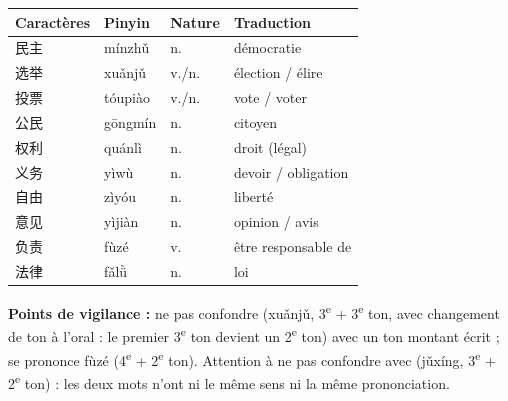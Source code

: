 \documentclass[11pt]{article}
\newcommand{\zh}[1]{\ifmmode\text{#1}\else{#1}\fi}
\begin{document}
\begin{corrige}
\begin{center}
\begin{tabularx}{\linewidth}{|X|X|X|X|}
\hline
\rowcolor{popblueL} \textbf{Caractères} & \textbf{Pinyin} & \textbf{Nature} & \textbf{Traduction} \\ \hline
民主 & mínzhǔ & n. & démocratie \\ \hline
选举 & xuǎnjǔ & v./n. & élection / élire \\ \hline
投票 & tóupiào & v./n. & vote / voter \\ \hline
公民 & gōngmín & n. & citoyen \\ \hline
权利 & quánlì & n. & droit (légal) \\ \hline
义务 & yìwù & n. & devoir / obligation \\ \hline
自由 & zìyóu & n. & liberté \\ \hline
意见 & yìjiàn & n. & opinion / avis \\ \hline
负责 & fùzé & v. & être responsable de \\ \hline
法律 & fǎlǜ & n. & loi \\ \hline
\end{tabularx}
\end{center}
\textbf{Points de vigilance :} ne pas confondre \zh{选举} (xuǎnjǔ, 3\textsuperscript{e} + 3\textsuperscript{e} ton, avec changement de ton à l'oral : le premier 3\textsuperscript{e} ton devient un 2\textsuperscript{e} ton) avec un ton montant écrit ; \zh{负责} se prononce fùzé (4\textsuperscript{e} + 2\textsuperscript{e} ton). Attention à ne pas confondre avec \zh{举行} (jǔxíng, 3\textsuperscript{e} + 2\textsuperscript{e} ton) : les deux mots n'ont ni le même sens ni la même prononciation.
\end{corrige}
\end{document}

